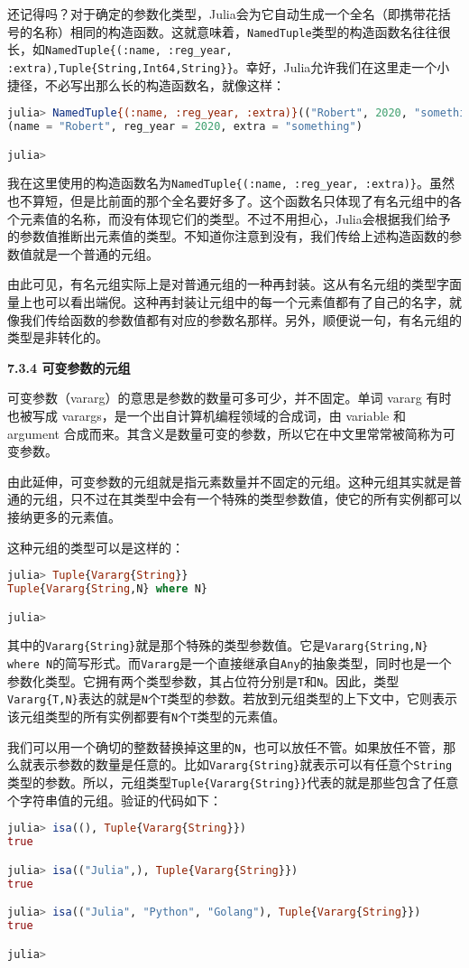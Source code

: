 还记得吗？对于确定的参数化类型，Julia会为它自动生成一个全名（即携带花括号的名称）相同的构造函数。这就意味着，\verb|NamedTuple|类型的构造函数名往往很长，如\verb|NamedTuple{(:name, :reg_year, :extra),Tuple{String,Int64,String}}|。幸好，Julia允许我们在这里走一个小捷径，不必写出那么长的构造函数名，就像这样：
\begin{lstlisting}[language=julia]
julia> NamedTuple{(:name, :reg_year, :extra)}(("Robert", 2020, "something"))
(name = "Robert", reg_year = 2020, extra = "something")

julia> 
\end{lstlisting}

我在这里使用的构造函数名为\verb|NamedTuple{(:name, :reg_year, :extra)}|。虽然也不算短，但是比前面的那个全名要好多了。这个函数名只体现了有名元组中的各个元素值的名称，而没有体现它们的类型。不过不用担心，Julia会根据我们给予的参数值推断出元素值的类型。不知道你注意到没有，我们传给上述构造函数的参数值就是一个普通的元组。

由此可见，有名元组实际上是对普通元组的一种再封装。这从有名元组的类型字面量上也可以看出端倪。这种再封装让元组中的每一个元素值都有了自己的名字，就像我们传给函数的参数值都有对应的参数名那样。另外，顺便说一句，有名元组的类型是非转化的。

\textbf{7.3.4 可变参数的元组}

可变参数（vararg）的意思是参数的数量可多可少，并不固定。单词 vararg 有时也被写成 varargs，是一个出自计算机编程领域的合成词，由 variable 和 argument 合成而来。其含义是数量可变的参数，所以它在中文里常常被简称为可变参数。

由此延伸，可变参数的元组就是指元素数量并不固定的元组。这种元组其实就是普通的元组，只不过在其类型中会有一个特殊的类型参数值，使它的所有实例都可以接纳更多的元素值。

这种元组的类型可以是这样的：
\begin{lstlisting}[language=julia]
julia> Tuple{Vararg{String}}
Tuple{Vararg{String,N} where N}

julia> 
\end{lstlisting}

其中的\verb|Vararg{String}|就是那个特殊的类型参数值。它是\verb|Vararg{String,N} where N|的简写形式。而\verb|Vararg|是一个直接继承自\verb|Any|的抽象类型，同时也是一个参数化类型。它拥有两个类型参数，其占位符分别是\verb|T|和\verb|N|。因此，类型\verb|Vararg{T,N}|表达的就是\verb|N|个\verb|T|类型的参数。若放到元组类型的上下文中，它则表示该元组类型的所有实例都要有\verb|N|个\verb|T|类型的元素值。

我们可以用一个确切的整数替换掉这里的\verb|N|，也可以放任不管。如果放任不管，那么就表示参数的数量是任意的。比如\verb|Vararg{String}|就表示可以有任意个\verb|String|类型的参数。所以，元组类型\verb|Tuple{Vararg{String}}|代表的就是那些包含了任意个字符串值的元组。验证的代码如下：
\begin{lstlisting}[language=julia]
julia> isa((), Tuple{Vararg{String}})
true

julia> isa(("Julia",), Tuple{Vararg{String}})
true

julia> isa(("Julia", "Python", "Golang"), Tuple{Vararg{String}})
true

julia> 
\end{lstlisting}

